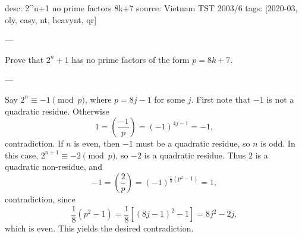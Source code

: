 desc: 2^n+1 no prime factors 8k+7
source: Vietnam TST 2003/6
tags: [2020-03, oly, easy, nt, heavynt, qr]

---

Prove that $2^n+1$ has no prime factors of the form $p=8k+7$.

---

Say $2^n\equiv-1\pmod p$, where $p=8j-1$ for some $j$. First note that $-1$ is not a quadratic residue. Otherwise \[1=\left(\frac{-1}p\right)=(-1)^{4j-1}=-1,\]
contradiction. If $n$ is even, then $-1$ must be a quadratic residue, so $n$ is odd. In this case, $2^{n+1}\equiv-2\pmod p$, so $-2$ is a quadratic residue. Thus $2$ is a quadratic non-residue, and \[-1=\left(\frac2p\right)=(-1)^{\tfrac18\left(p^2-1\right)}=1,\]
contradiction, since \[\frac18\left(p^2-1\right)=\frac18\left[(8j-1)^2-1\right]=8j^2-2j,\]
which is even. This yields the desired contradiction.
